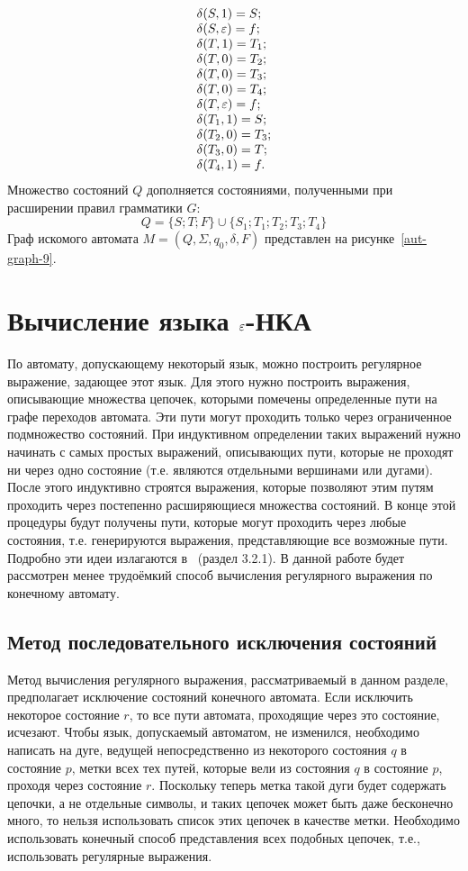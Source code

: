 \begin{myexample}
\[\begin{array}{l}
				\delta(S, 1) = S; \\
				\delta(S, \varepsilon) = f; \\
				\delta(T, 1) = T_1; \\
				\delta(T, 0) = T_2; \\
				\delta(T, 0) = T_3; \\
				\delta(T, 0) = T_4; \\
				\delta(T, \varepsilon) = f; \\
				\delta(T_1, 1) = S; \\
				\delta(T_2, 0) = T_3; \\
				\delta(T_3, 0) = T; \\
				\delta(T_4, 1) = f.
		\end{array}
	\]
	Множество состояний $Q$ дополняется состояниями, полученными при расширении правил грамматики $G$:
	\[
	Q = \{ S; T; F \} \cup \{ S_1; T_1; T_2; T_3; T_4 \}
	\]
	Граф искомого автомата $M = (Q, \Sigma, q_0, \delta, F)$ представлен на рисунке~\ref{aut-graph-9}.
	
\end{myexample}
\section{Вычисление языка $\varepsilon$-НКА}
\label{Chapter4FALang}
По автомату, допускающему некоторый язык, можно построить регулярное выражение, задающее этот язык. Для этого нужно построить выражения, описывающие множества цепочек, которыми помечены определенные пути на графе переходов автомата. Эти пути могут проходить только через ограниченное подмножество состояний. При индуктивном определении таких выражений нужно начинать с самых простых выражений, описывающих пути, которые не проходят ни через одно состояние (т.е. являются отдельными вершинами или дугами). После этого индуктивно строятся выражения, которые позволяют этим путям проходить через постепенно расширяющиеся множества состояний. В конце этой процедуры будут получены пути, которые могут проходить через любые состояния, т.е. генерируются выражения, представляющие все возможные пути. Подробно эти идеи излагаются в~\cite{Hop} (раздел 3.2.1).
В данной работе будет рассмотрен менее трудоёмкий способ вычисления регулярного выражения по конечному автомату.
\subsection*{Метод последовательного исключения состояний}
Метод вычисления регулярного выражения, рассматриваемый в данном разделе, предполагает исключение состояний конечного автомата. Если исключить некоторое состояние $r$, то все пути автомата, проходящие через это состояние, исчезают. Чтобы язык, допускаемый автоматом, не изменился, необходимо написать на дуге, ведущей непосредственно из некоторого состояния $q$ в состояние $p$, метки всех тех путей, которые вели из состояния $q$ в состояние $p$, проходя через состояние $r$. Поскольку теперь метка такой дуги будет содержать цепочки, а не отдельные символы, и таких цепочек может быть даже бесконечно много, то нельзя использовать список этих цепочек в качестве метки. Необходимо использовать конечный способ представления всех подобных цепочек, т.е., использовать регулярные выражения.


